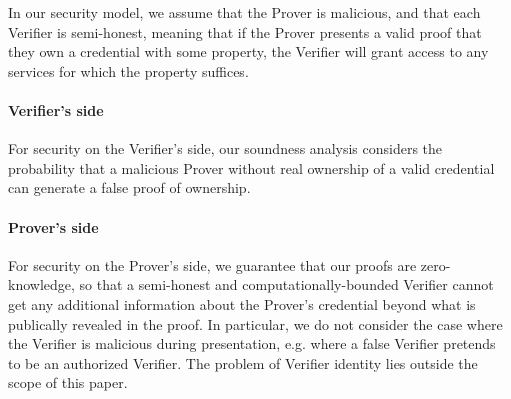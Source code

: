 
        


In our security model, we assume that the Prover is malicious, and that each Verifier is semi-honest, meaning that if the Prover presents a valid proof that they own a credential with some property, the Verifier will grant access to any services for which the property suffices.


\paragraph{Verifier's side} For security on the Verifier's side, our soundness analysis considers the probability that a malicious Prover without real ownership of a valid credential can generate a false proof of ownership. 


\paragraph{Prover's side} For security on the Prover's side, we guarantee that our proofs are zero-knowledge, so that a semi-honest and computationally-bounded Verifier cannot get any additional information about the Prover's credential beyond what is publically revealed in the proof.
In particular, we do not consider the case where the Verifier is malicious during presentation, e.g. where a false Verifier pretends to be an authorized Verifier. The problem of Verifier identity lies outside the scope of this paper.


